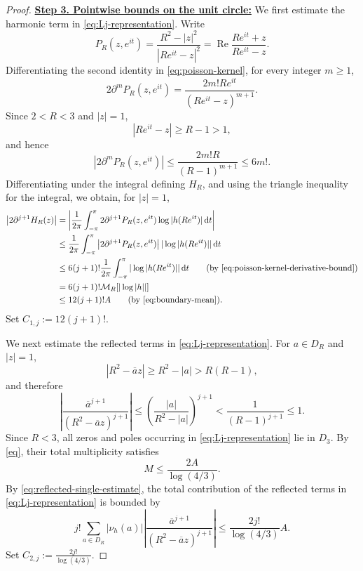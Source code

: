 \documentclass[12pt,letterpaper,reqno]{amsart}
\theoremstyle{definition}
\numberwithin{equation}{section}
\newcommand{\mean}[2]{\mathcal M_{#1}\!\left[#2\right]}
\begin{document}
\begin{proof}
\medskip\noindent
\textbf{\underline{Step 3. Pointwise bounds on the unit circle:}}
We first estimate the harmonic term in \eqref{eq:Lj-representation}. Write
\begin{equation}\label{eq:poisson-kernel}
P_R(z,e^{it})
= \frac{R^2-|z|^2}{|Re^{it}-z|^2}
= \operatorname{Re}\frac{Re^{it}+z}{Re^{it}-z}.
\end{equation}
Differentiating the second identity in \eqref{eq:poisson-kernel}, for every
integer \(m\ge1\),
$$
2\partial^mP_R(z,e^{it})
=
\frac{2m!Re^{it}}{(Re^{it}-z)^{m+1}}.
$$
Since \(2<R<3\) and \(|z|=1\),
$$
|Re^{it}-z|\ge R-1>1,
$$
and hence
\begin{equation}\label{eq:poisson-kernel-derivative-bound}
\left|2\partial^mP_R(z,e^{it})\right|
\le
\frac{2m!R}{(R-1)^{m+1}}
\le 6m!.
\end{equation}
Differentiating under the integral defining \(H_R\), and using the triangle
inequality for the integral, we obtain, for \(|z|=1\),
\begin{equation}\label{eq:poisson-harmonic-estimate}
\begin{aligned}
\left|2\partial^{j+1}H_R(z)\right|
&=
\left|
\frac1{2\pi}\int_{-\pi}^{\pi}
2\partial^{j+1}P_R(z,e^{it})
\log|h(Re^{it})|\,\mathrm dt
\right|\\
&\le
\frac1{2\pi}\int_{-\pi}^{\pi}
\left|2\partial^{j+1}P_R(z,e^{it})\right|
|\log|h(Re^{it})||\,\mathrm dt\\
&\le
6(j+1)!
\frac1{2\pi}\int_{-\pi}^{\pi}
|\log|h(Re^{it})||\,\mathrm dt
\qquad\text{(by \eqref{eq:poisson-kernel-derivative-bound})}\\
&=
6(j+1)!\mean R{|\log|h||}\\
&\le
12(j+1)!A
\qquad\text{(by \eqref{eq:boundary-mean})}.
\end{aligned}
\end{equation}
Set
$
C_{1,j}:=12(j+1)!.
$

We next estimate the reflected terms in \eqref{eq:Lj-representation}.
For \(a\in D_R\) and \(|z|=1\),
$$
|R^2-\overline a z|
\ge R^2-|a|
>R(R-1),
$$
and therefore
\begin{equation}\label{eq:reflected-single-estimate}
\left|
\frac{\overline a^{j+1}}
{(R^2-\overline a z)^{j+1}}
\right|
\le
\left(\frac{|a|}{R^2-|a|}\right)^{j+1}
<
\frac1{(R-1)^{j+1}}
\le1.
\end{equation}
Since \(R<3\), all zeros and poles occurring in
\eqref{eq:Lj-representation} lie in \(D_3\). By \eqref{eq}, their total multiplicity satisfies
$$
M\le\frac{2A}{\log(4/3)}.
$$
By \eqref{eq:reflected-single-estimate}, the total contribution of the
reflected terms in \eqref{eq:Lj-representation} is bounded by
\begin{equation}\label{eq:reflected-total-estimate}
j!\sum_{a\in D_R}|\nu_h(a)|
\left|
\frac{\overline a^{j+1}}
{(R^2-\overline a z)^{j+1}}
\right|
\le
\frac{2j!}{\log(4/3)}A.
\end{equation}
Set
$
C_{2,j}:=\frac{2j!}{\log(4/3)}.
$


\end{proof}
\end{document}
